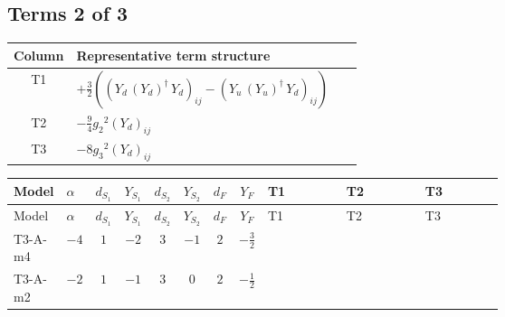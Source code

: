 \documentclass[8pt]{article}
\begin{document}
\begin{landscape}
\subsection*{Terms 2 of 3}
\begin{center}
\begin{tabular}{@{}c >{\raggedright\arraybackslash}p{0.82\linewidth}@{}}
\toprule
Column & Representative term structure \\
\midrule
T1 & \(\displaystyle +\frac{3}{2} (\left({Y_d}\,\left({Y_d}\right)^{\dagger}\,{Y_d}\right)_{ij}-\left({Y_u}\,\left({Y_u}\right)^{\dagger}\,{Y_d}\right)_{ij})\) \\
\midrule
T2 & \(\displaystyle -\frac{9}{4} {g_2}^2 \left({Y_d}\right)_{ij}\) \\
\midrule
T3 & \(\displaystyle -8 {g_3}^2 \left({Y_d}\right)_{ij}\) \\
\midrule
\bottomrule
\end{tabular}
\end{center}
\smallskip
\tiny
\begin{longtable}{@{}llcccccc >{\raggedright\arraybackslash}p{0.21\linewidth} >{\raggedright\arraybackslash}p{0.21\linewidth} >{\raggedright\arraybackslash}p{0.21\linewidth}@{}}
\toprule
Model & $\alpha$ & $d_{S_1}$ & $Y_{S_1}$ & $d_{S_2}$ & $Y_{S_2}$ & $d_F$ & $Y_F$ & T1 & T2 & T3 \\
\midrule
\endfirsthead
\toprule
Model & $\alpha$ & $d_{S_1}$ & $Y_{S_1}$ & $d_{S_2}$ & $Y_{S_2}$ & $d_F$ & $Y_F$ & T1 & T2 & T3 \\
\midrule
\endhead
T3-A-m4 & $-4$ & $1$ & $-2$ & $3$ & $-1$ & $2$ & $-\frac{3}{2}$ & \scriptsize\adjustbox{max width=\linewidth}{$\begin{gathered} +\frac{3}{2} (\left({Y_d}\,\left({Y_d}\right)^{\dagger}\,{Y_d}\right)_{ij}-\left({Y_u}\,\left({Y_u}\right)^{\dagger}\,{Y_d}\right)_{ij})\end{gathered}$} & \scriptsize\adjustbox{max width=\linewidth}{$\begin{gathered} -\frac{9}{4} {g_2}^2 \left({Y_d}\right)_{ij}\end{gathered}$} & \scriptsize\adjustbox{max width=\linewidth}{$\begin{gathered} -8 {g_3}^2 \left({Y_d}\right)_{ij}\end{gathered}$} \\
\midrule
T3-A-m2 & $-2$ & $1$ & $-1$ & $3$ & $0$ & $2$ & $-\frac{1}{2}$ & \scriptsize\adjustbox{max width=\linewidth}{$\begin{gathered} +\frac{3}{2} (\left({Y_d}\,\left({Y_d}\right)^{\dagger}\,{Y_d}\right)_{ij}-\left({Y_u}\,\left({Y_u}\right)^{\dagger}\,{Y_d}\right)_{ij})\end{gathered}$} & \scriptsize\adjustbox{max width=\linewidth}{$\begin{gathered} -\frac{9}{4} {g_2}^2 \left({Y_d}\right)_{ij}\end{gathered}$} & \scriptsize\adjustbox{max width=\linewidth}{$\begin{gathered} -8 {g_3}^2 \left({Y_d}\right)_{ij}\end{gathered}$} \\

\end{longtable}
\end{landscape}
\end{document}
